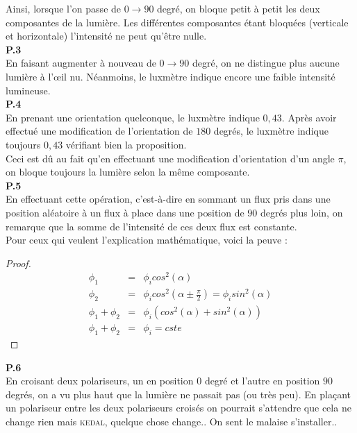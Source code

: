 \documentclass	[11pt, a4paper, openany]{book}
\begin{document}
		Ainsi, lorsque l'on passe de $0 \rightarrow 90$ degré, on bloque petit à petit les deux composantes de la lumière. Les différentes composantes étant bloquées (verticale et horizontale) l'intensité ne peut qu'être nulle.\\
		
		\textbf{P.3}\\
		En faisant augmenter à nouveau de $0 \rightarrow 90$ degré, on ne distingue plus aucune lumière à l'œil nu. Néanmoins, le luxmètre indique encore une faible intensité lumineuse.\\
		
		\textbf{P.4}\\
		En prenant une orientation quelconque, le luxmètre indique $0,43$. Après avoir effectué une modification de l'orientation de $180$ degrés, le luxmètre indique toujours $0,43$ vérifiant bien la proposition.\\
		Ceci est dû au fait qu'en effectuant une modification d'orientation d'un angle $\pi$, on bloque toujours la lumière selon la même composante.\\
		
		\textbf{P.5}\\
		En effectuant cette opération, c'est-à-dire en sommant un flux pris dans une position aléatoire à un flux à place dans une position de $90$ degrés plus loin, on remarque que la somme de l'intensité de ces deux flux est constante.\\
		Pour ceux qui veulent l'explication mathématique, voici la peuve : \\
		\begin{proof}
			\begin{eqnarray}
				\phi_1 &=& \phi_icos^2(\alpha)\\
				\phi_2 &=& \phi_icos^2(\alpha \pm \frac{\pi}{2}) = \phi_isin^2(\alpha)\\
				\phi_1 + \phi_2 &=& \phi_i(cos^2(\alpha) + sin^2(\alpha))\\
				\phi_1 + \phi_2 &=& \phi_i = cste
			\end{eqnarray}
		\end{proof}
		
		\textbf{P.6}\\
		En croisant deux polariseurs, un en position $0$ degré et l'autre en position $90$ degrés, on a vu plus haut que la lumière ne passait pas (ou très peu). En plaçant un polariseur entre les deux polariseurs croisés on pourrait s'attendre que cela ne change rien mais \textsc{kedal}, quelque chose change.. On sent le malaise s'installer..\\
		
\end{document}
